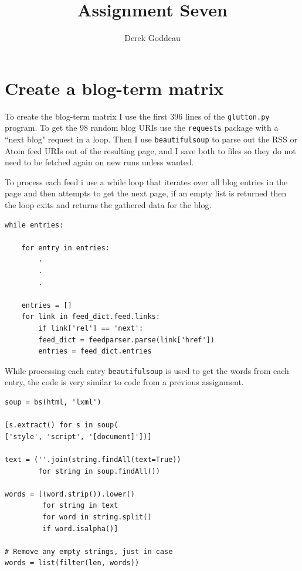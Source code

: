 \documentclass[12pt, a4paper]{article}
\author{Derek Goddeau}
\title{Assignment Seven}
\newcommand{\code}[1]{\texttt{#1}}
\begin{document}
\maketitle

\newpage



\section{Create a blog-term matrix}

To create the blog-term matrix I use the first $396$ lines of the \code{glutton.py} program. To get the 98 random blog URIs use the \code{requests} package with a ``next blog" request in a loop. Then I use \code{beautifulsoup} to parse out the RSS or Atom feed URIs out of the resulting page, and I save both to files so they do not need to be fetched again on new runs unless wanted.

To process each feed i use a while loop that iterates over all blog entries in the page and then attempts to get the next page, if an empty list is returned then the loop exits and returns the gathered data for the blog.

\begin{minipage}{\linewidth} %
\vspace{2em}
\begin{verbatim}
while entries:

    for entry in entries:
        .
        .
        .

    entries = []
    for link in feed_dict.feed.links:
        if link['rel'] == 'next':
        feed_dict = feedparser.parse(link['href'])
        entries = feed_dict.entries
\end{verbatim}
\vspace{2em}
\end{minipage}

\newpage
\noindent
While processing each entry \code{beautifulsoup} is used to get the words from each entry, the code is very similar to code from a previous assignment.

\begin{minipage}{\linewidth} %
\vspace{2em}
\begin{verbatim}
soup = bs(html, 'lxml')

[s.extract() for s in soup(
['style', 'script', '[document]'])]

text = (''.join(string.findAll(text=True))
        for string in soup.findAll())

words = [(word.strip()).lower()
         for string in text
         for word in string.split()
         if word.isalpha()]

# Remove any empty strings, just in case
words = list(filter(len, words))
\end{verbatim}
\vspace{2em}
\end{minipage}
\end{document}
